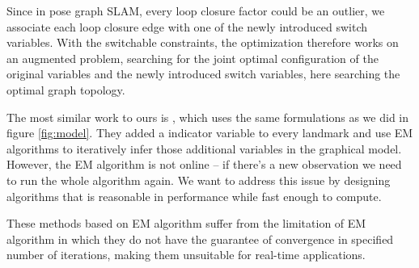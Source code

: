 Since in pose graph SLAM, every loop closure factor could be an outlier, we
associate each loop closure edge with one of the newly introduced switch
variables. With the switchable constraints, the optimization therefore works
on an augmented problem, searching for the joint optimal configuration of the
original variables and the newly introduced switch variables, here searching
the optimal graph topology. 

The most similar work to ours is \cite{rogers2010slam}, which uses the same formulations as we did in figure \ref{fig:model}. They added a indicator variable to every landmark and use EM algorithms to iteratively infer those additional variables in the graphical model. However, the EM algorithm is not online -- if there's a new observation we need to run the whole algorithm again. We want to address this issue by designing algorithms that is reasonable in performance while fast enough to compute.


These methods based on EM algorithm suffer from the limitation of EM algorithm
in which they do not have the guarantee of convergence in specified number of
iterations, making them unsuitable for real-time applications.

